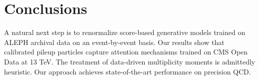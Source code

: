 \section{Conclusions}\label{sec:conclusions}

A natural next step is to renormalize score-based generative models
trained on ALEPH archival data on an event-by-event basis. Our results
show that calibrated pileup particles capture attention mechanisms
trained on CMS Open Data at 13 TeV. The treatment of data-driven
multiplicity moments is admittedly heuristic. Our approach achieves
state-of-the-art performance on precision QCD.

